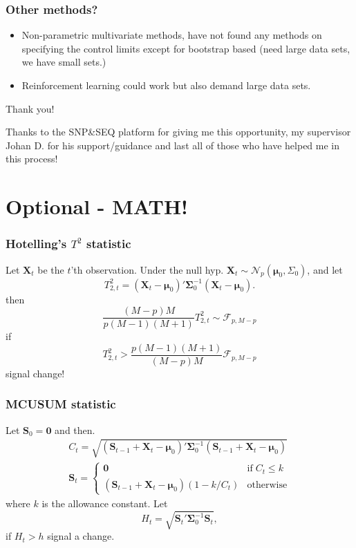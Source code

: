 \documentclass[10pt]{beamer}\usepackage[]{graphicx}\usepackage[]{color}
\begin{document}
 \begin{frame}\frametitle{Other methods?}
 \begin{itemize}
 \item Non-parametric multivariate methods, have not found any methods on specifying the control limits except for bootstrap based (need large data sets, we have small sets.)
 \item Reinforcement learning could work but also demand large data sets.
 \end{itemize}
 \end{frame}

\begin{frame}
\begin{center}
{\Large Thank you!} 
\newline
\end{center}
Thanks to the SNP\&SEQ platform for giving me this opportunity, my supervisor Johan D. for his support/guidance and last all of those who have helped me in this process! 
\end{frame}

\section{Optional - MATH!}

\begin{frame}\frametitle{Hotelling's $T^2$ statistic}
Let $\mathbf{X}_t$ be the $t$'th observation. Under the null hyp. $\mathbf{X}_t \sim \mathcal{N}_p(\boldsymbol{\mu}_0,\Sigma_0)$, and let
$$
T^2_{2,t} = (\mathbf{X}_t-\boldsymbol{\mu}_0)'\boldsymbol{\Sigma}^{-1}_0(\mathbf{X}_t-\boldsymbol{\mu}_0).
$$ 
then
$$
\frac{(M-p)M}{p(M-1)(M+1)} T^2_{2,t} \sim \mathcal{F}_{p,M-p}
$$
if 
$$
T^2_{2,t}>\frac{p(M-1)(M+1)}{(M-p)M}\mathcal{F}_{p,M-p}$$
signal change!
\end{frame}

\begin{frame}\frametitle{MCUSUM statistic}
Let $\mathbf{S}_0=\mathbf{0}$ and then. 
\begin{align}
&C_t=\sqrt{(\mathbf{S}_{t-1}+\mathbf{X}_t-\boldsymbol{\mu}_0)'\boldsymbol{\Sigma}^{-1}_0
(\mathbf{S}_{t-1}+\mathbf{X}_t-\boldsymbol{\mu}_0)}\label{MCUSUM} &\\ 
&\mathbf{S}_t=\begin{cases}
\mathbf{0} & \text{if} \; C_t \leq k \\
(\mathbf{S}_{t-1}+\mathbf{X}_t-\boldsymbol{\mu}_0)(1-k/C_t) & \text{otherwise}
\end{cases} \label{MCUSUM2} &
\end{align}
where $k$ is the allowance constant. Let 
\begin{equation}\label{Ht}
H_t=\sqrt{\mathbf{S}_t'\boldsymbol{\Sigma}^{-1}_0 \mathbf{S}_t},
\end{equation} 
if $H_t>h$ signal a change.
\end{frame}
\end{document}
